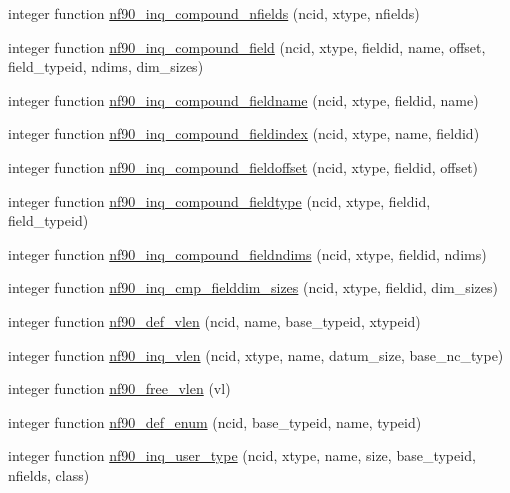 \begin{DoxyCompactItemize}
\item 
integer function \hyperlink{netcdf4__func_8f90_a69fa47019c409dbc9a8e0bf0da580ad1}{nf90\+\_\+inq\+\_\+compound\+\_\+nfields} (ncid, xtype, nfields)
\item 
integer function \hyperlink{netcdf4__func_8f90_aec2d2e8b7f4228df93a8c97512afb954}{nf90\+\_\+inq\+\_\+compound\+\_\+field} (ncid, xtype, fieldid, name, offset, field\+\_\+typeid, ndims, dim\+\_\+sizes)
\item 
integer function \hyperlink{netcdf4__func_8f90_af0b1a28ac01add213011608609de2e29}{nf90\+\_\+inq\+\_\+compound\+\_\+fieldname} (ncid, xtype, fieldid, name)
\item 
integer function \hyperlink{netcdf4__func_8f90_a836c25c9096336fb488ed8f932d33ca5}{nf90\+\_\+inq\+\_\+compound\+\_\+fieldindex} (ncid, xtype, name, fieldid)
\item 
integer function \hyperlink{netcdf4__func_8f90_aacc8100184a9f6fc10217f28f78bc69b}{nf90\+\_\+inq\+\_\+compound\+\_\+fieldoffset} (ncid, xtype, fieldid, offset)
\item 
integer function \hyperlink{netcdf4__func_8f90_a470f28d80eea9a7d1805484db9ff55ac}{nf90\+\_\+inq\+\_\+compound\+\_\+fieldtype} (ncid, xtype, fieldid, field\+\_\+typeid)
\item 
integer function \hyperlink{netcdf4__func_8f90_a51c0ea15f1ac7f606423cc2c2f03be46}{nf90\+\_\+inq\+\_\+compound\+\_\+fieldndims} (ncid, xtype, fieldid, ndims)
\item 
integer function \hyperlink{netcdf4__func_8f90_aaa372f47755cb3b33f44b42b1e8ab2bd}{nf90\+\_\+inq\+\_\+cmp\+\_\+fielddim\+\_\+sizes} (ncid, xtype, fieldid, dim\+\_\+sizes)
\item 
integer function \hyperlink{netcdf4__func_8f90_a1ae0ad08b63c955cc37919e3cf9a949e}{nf90\+\_\+def\+\_\+vlen} (ncid, name, base\+\_\+typeid, xtypeid)
\item 
integer function \hyperlink{netcdf4__func_8f90_a2327d1de48a24f08d3365443e5f03007}{nf90\+\_\+inq\+\_\+vlen} (ncid, xtype, name, datum\+\_\+size, base\+\_\+nc\+\_\+type)
\item 
integer function \hyperlink{netcdf4__func_8f90_a5b9af10ec3301e9e889799d15b9576b9}{nf90\+\_\+free\+\_\+vlen} (vl)
\item 
integer function \hyperlink{netcdf4__func_8f90_a1bb3cc5411fee3546c939aab7914c634}{nf90\+\_\+def\+\_\+enum} (ncid, base\+\_\+typeid, name, typeid)
\item 
integer function \hyperlink{netcdf4__func_8f90_a9554f06f96c5793f6c00f16b61ed656a}{nf90\+\_\+inq\+\_\+user\+\_\+type} (ncid, xtype, name, size, base\+\_\+typeid, nfields, class)

\end{DoxyCompactItemize}
